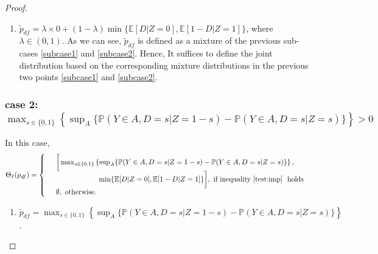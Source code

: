\documentclass[12pt]{article}
\theoremstyle{plain}
\theoremstyle{definition}
\theoremstyle{remark}
\begin{document}
\begin{proof}
\begin{enumerate}
Now, suppose $\tilde{p}_{df}=\mathbb E[1-D \mid Z=1]$. Then $\mathbb{E}[D  \vert  Z=0] \geq \mathbb{E}[1-D  \vert  Z=1]$, and $\tilde{p}_n=0$. The argument is similar to the one above if we replace $D$ and $Z$ by $\tilde{D}=1-D$ and $\tilde{Z}=1-Z$, respectively. 

    \item $\tilde{p}_{df}=\lambda\times 0 + (1-\lambda) \min \{\mathbb{E}[D  \vert  Z=0], \mathbb{E}[1-D  \vert  Z=1]\}$, where $\lambda \in (0,1)$. As we can see, $\tilde{p}_{df}$ is defined as a mixture of the previous sub-cases \ref{subcase1} and \ref{subcase2}. Hence, It suffices to define the joint distribution based on the corresponding mixture distributions in the previous two points \ref{subcase1} and \ref{subcase2}.
\end{enumerate}


\subsubsection*{case 2: $\max_{s \in\{0,1\}}\left\{\sup _A\{\mathbb{P}(Y \in A, D=s  \vert  Z=1-s)-\mathbb{P}(Y \in A, D=s  \vert  Z=s)\}\right\} > 0$}
In this case, 
\small \begin{equation*}
    \Theta_{I}(p_{df}) = \left\{\begin{array}{lll}
    & \bigg[\max _{s \in\{0,1\}}\left\{\sup _A\{\mathbb{P}(Y \in A, D=s  \vert  Z=1-s)-\mathbb{P}(Y \in A, D=s  \vert  Z=s)\}\right\}, \\
    & \qquad \qquad \qquad \min \{\mathbb{E}[D  \vert  Z=0], \mathbb{E}[1-D  \vert  Z=1]\}\bigg], \text{ if inequality \eqref{test:imp} } \text{ holds } \\
    & \emptyset, \text{ otherwise}.
    \end{array}\right.
    \end{equation*}

\begin{enumerate}
\item \label{subcase4} $\tilde{p}_{df} =\max_{s \in\{0,1\}}\left\{\sup _A\{\mathbb{P}(Y \in A, D=s  \vert  Z=1-s)-\mathbb{P}(Y \in A, D=s  \vert  Z=s)\}\right\}$.


\end{enumerate}
\end{proof}
\end{document}
